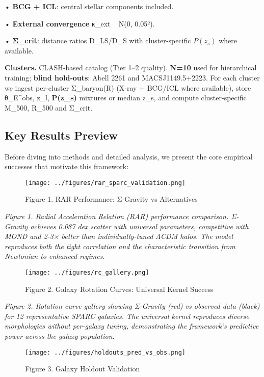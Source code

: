 \documentclass[11pt,a4paper]{article}
\begin{document}
• \textbf{BCG + ICL}: central stellar components included.  

• \textbf{External convergence} κ\_ext ~ N(0, 0.05²).  

• \textbf{Σ\_crit}: distance ratios D\_LS/D\_S with cluster‑specific $P(z_s)$ where available.


\textbf{Clusters.} CLASH‑based catalog (Tier 1–2 quality). \textbf{N=10} used for hierarchical training; \textbf{blind hold‑outs}: Abell 2261 and MACSJ1149.5+2223. For each cluster we ingest per‑cluster Σ\_baryon(R) (X‑ray + BCG/ICL where available), store {θ\_E^obs, z\_l, \textbf{P(z\_s)} mixtures or median z\_s}, and compute cluster‑specific M\_500, R\_500 and Σ\_crit.


\subsection{Key Results Preview}


Before diving into methods and detailed analysis, we present the core empirical successes that motivate this framework:


\begin{figure}[h]
\centering
\texttt{[image: ../figures/rar\_sparc\_validation.png]}
\caption{Figure 1. RAR Performance: Σ-Gravity vs Alternatives}
\end{figure}


\textit{Figure 1. Radial Acceleration Relation (RAR) performance comparison. Σ-Gravity achieves 0.087 dex scatter with universal parameters, competitive with MOND and 2-3× better than individually-tuned ΛCDM halos. The model reproduces both the tight correlation and the characteristic transition from Newtonian to enhanced regimes.}


\begin{figure}[h]
\centering
\texttt{[image: ../figures/rc\_gallery.png]}
\caption{Figure 2. Galaxy Rotation Curves: Universal Kernel Success}
\end{figure}


\textit{Figure 2. Rotation curve gallery showing Σ-Gravity (red) vs observed data (black) for 12 representative SPARC galaxies. The universal kernel reproduces diverse morphologies without per-galaxy tuning, demonstrating the framework's predictive power across the galaxy population.}


\begin{figure}[h]
\centering
\texttt{[image: ../figures/holdouts\_pred\_vs\_obs.png]}
\caption{Figure 3. Galaxy Holdout Validation}
\end{figure}
\end{document}
